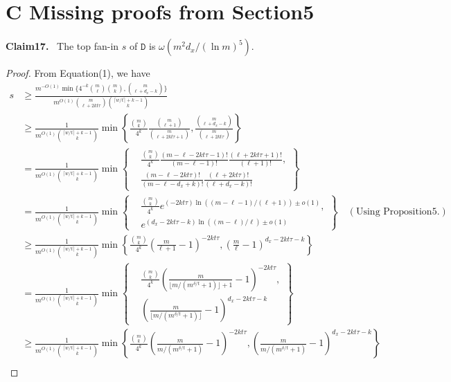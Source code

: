 \documentclass[10pt,a4paper]{article}
\newenvironment{authorclaim}[1]{\par\medskip\noindent\textbf{#1.}\ \ignorespaces}{\par\medskip}
\begin{document}
\section*{C Missing proofs from Section5}
\begin{authorclaim}{Claim17}
The top fan-in $s$ of $\mathtt D$ is $\omega(m^2d_x/(\ln m)^5)$.
\end{authorclaim}
\begin{proof}
From Equation(1), we have
\begin{align*}
s&\ge\frac{m^{-O(1)}\min\{4^{-k}\binom m\ell\binom mk,\binom m{\ell+d_x-k}\}}
{m^{O(1)}\binom m{\ell+2kt\tau}\binom{\lceil w/t\rceil+k-1}k}\\
&\ge\frac1{m^{O(1)}\binom{\lceil w/t\rceil+k-1}k}
\min\left\{\frac{\binom mk}{4^k}\frac{\binom m{\ell+1}}{\binom m{\ell+2kt\tau+1}},
\frac{\binom m{\ell+d_x-k}}{\binom m{\ell+2kt\tau}}\right\}\\
&=\frac1{m^{O(1)}\binom{\lceil w/t\rceil+k-1}k}
\min\left\{\begin{aligned}
&\frac{\binom mk}{4^k}\frac{(m-\ell-2kt\tau-1)!}{(m-\ell-1)!}
\frac{(\ell+2kt\tau+1)!}{(\ell+1)!},\\
&\frac{(m-\ell-2kt\tau)!}{(m-\ell-d_x+k)!}
\frac{(\ell+2kt\tau)!}{(\ell+d_x-k)!}
\end{aligned}\right\}\\
&=\frac1{m^{O(1)}\binom{\lceil w/t\rceil+k-1}k}
\min\left\{\begin{aligned}
&\frac{\binom mk}{4^k}
e^{(-2kt\tau)\ln((m-\ell-1)/(\ell+1))\pm o(1)},\\
&e^{(d_x-2kt\tau-k)\ln((m-\ell)/\ell)\pm o(1)}
\end{aligned}\right\}\quad(\text{Using Proposition5.})\\
&\ge\frac1{m^{O(1)}\binom{\lceil w/t\rceil+k-1}k}
\min\left\{\frac{\binom mk}{4^k}\left(\frac m{\ell+1}-1\right)^{-2kt\tau},
\left(\frac m\ell-1\right)^{d_x-2kt\tau-k}\right\}\\
&=\frac1{m^{O(1)}\binom{\lceil w/t\rceil+k-1}k}
\min\left\{\begin{aligned}
&\frac{\binom mk}{4^k}
\left(\frac m{\lfloor m/(m^{\delta/t}+1)\rfloor+1}-1\right)^{-2kt\tau},\\
&\left(\frac m{\lfloor m/(m^{\delta/t}+1)\rfloor}-1\right)^{d_x-2kt\tau-k}
\end{aligned}\right\}\\
&\ge\frac1{m^{O(1)}\binom{\lceil w/t\rceil+k-1}k}
\min\left\{\frac{\binom mk}{4^k}\left(\frac m{m/(m^{\delta/t}+1)}-1\right)^{-2kt\tau},
\left(\frac m{m/(m^{\delta/t}+1)}-1\right)^{d_x-2kt\tau-k}\right\}\\

\end{align*}
\end{proof}
\end{document}
